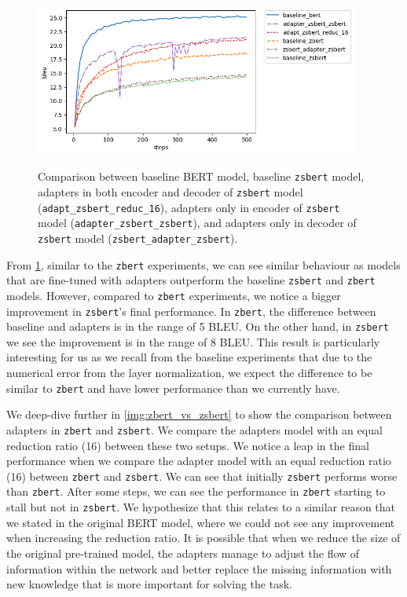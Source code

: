 \begin{figure}[h]
    {\includegraphics[width=0.95\textwidth]{img/zsbert_pos.png}}
    \centering
    \caption[Comparison between baseline BERT and \texttt{zsbert} models.]{Comparison between baseline BERT model, baseline \texttt{zsbert} model, adapters in both encoder and decoder of \texttt{zsbert} model (\texttt{adapt\_zsbert\_reduc\_16}), adapters only in encoder of \texttt{zsbert} model (\texttt{adapter\_zsbert\_zsbert}), and adapters only in decoder of \texttt{zsbert} model (\texttt{zsbert\_adapter\_zsbert}).}
    \label{img:zsbert_pos}
\end{figure}

From \cref{img:zsbert_pos}, similar to the \texttt{zbert} experiments, we can see similar behaviour as models that are fine-tuned with adapters outperform the baseline \texttt{zsbert} and \texttt{zbert} models. However, compared to \texttt{zbert} experiments, we notice a bigger improvement in \texttt{zsbert}'s final performance. In \texttt{zbert}, the difference between baseline and adapters is in the range of 5 BLEU. On the other hand, in \texttt{zsbert} we see the improvement is in the range of 8 BLEU. This result is particularly interesting for us as we recall from the baseline experiments that due to the numerical error from the layer normalization, we expect the difference to be similar to \texttt{zbert} and have lower performance than we currently have.

We deep-dive further in \cref{img:zbert_vs_zsbert} to show the comparison between adapters in \texttt{zbert} and \texttt{zsbert}. We compare the adapters model with an equal reduction ratio (16) between these two setups. We notice a leap in the final performance when we compare the adapter model with an equal reduction ratio (16) between \texttt{zbert} and \texttt{zsbert}. We can see that initially \texttt{zsbert} performs worse than \texttt{zbert}. After some steps, we can see the performance in \texttt{zbert} starting to stall but not in \texttt{zsbert}. We hypothesize that this relates to a similar reason that we stated in the original BERT model, where we could not see any improvement when increasing the reduction ratio. It is possible that when we reduce the size of the original pre-trained model, the adapters manage to adjust the flow of information within the network and better replace the missing information with new knowledge that is more important for solving the task.

